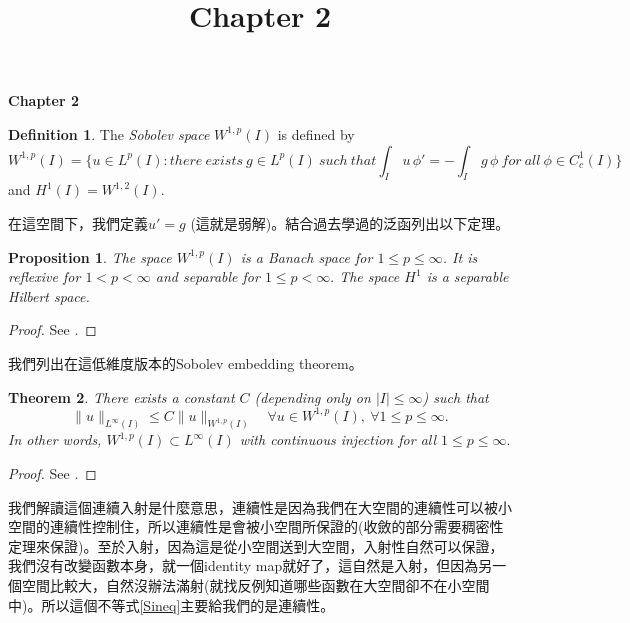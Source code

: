 \documentclass[14pt]{article}
\newtheorem{theorem}{Theorem}
\newtheorem{proposition}[theorem]{Proposition}
\theoremstyle{definition}
\newtheorem*{definition}{Definition}
\theoremstyle{remark}
\numberwithin{equation}{section}
\numberwithin{theorem}{section}
\begin{document}
\setcounter{section}{0}
\title{Chapter 2}

\thispagestyle{empty}
\begin{center}
{\LARGE \bf Chapter 2}
\end{center}

\begin{definition} The \emph{Sobolev space} $W^{1,p}(I)$ is defined by
\begin{equation}\label{Sineq}
W^{1,p}(I)=\{u\in L^p(I): there\ exists\ g\in L^p(I)\ such\ that \int_I\,u\,\phi'=-\int_I\,g\,\phi\ for\ all\ \phi\in C^1_c(I)\}
\end{equation}
and $H^1(I)=W^{1,2}(I)$. 
\end{definition}
在這空間下，我們定義$u'=g$ (這就是弱解)。結合過去學過的泛函列出以下定理。

\begin{proposition} The space $W^{1,p}(I)$ is a Banach space for $1\leq p\leq\infty$. It is reflexive for $1<p<\infty$ and separable for $1\leq p<\infty.$ The space $H^1$ is a separable Hilbert space.
\end{proposition}
\begin{proof} 
See \cite[p.~203]{Bre10}.
\end{proof}
我們列出在這低維度版本的Sobolev embedding theorem。

\begin{theorem}\label{Sobolevembedding} There exists a constant $C$ (depending only on $\lvert I\rvert\leq\infty$) such that 
$$
\lVert u\rVert_{L^\infty(I)}\leq C\lVert u\rVert_{W^{1,p}(I)}\quad\forall u\in W^{1,p}(I),\ \forall 1\leq p\leq\infty.
$$
In other words, $W^{1,p}(I)\subset L^\infty(I)$ with continuous injection for all $1\leq p\leq\infty.$ 
\end{theorem}
\begin{proof} 
See \cite[p.~213]{Bre10}.
\end{proof}
我們解讀這個連續入射是什麼意思，連續性是因為我們在大空間的連續性可以被小空間的連續性控制住，所以連續性是會被小空間所保證的(收斂的部分需要稠密性定理來保證)。至於入射，因為這是從小空間送到大空間，入射性自然可以保證，我們沒有改變函數本身，就一個identity map就好了，這自然是入射，但因為另一個空間比較大，自然沒辦法滿射(就找反例知道哪些函數在大空間卻不在小空間中)。所以這個不等式\eqref{Sineq}主要給我們的是連續性。
\end{document}
